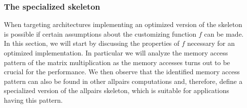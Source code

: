 \subsubsection{The specialized \allpairs skeleton}
\label{sec:opt_allpairs_skeleton}
When targeting \GPU architectures implementing an optimized version of the \allpairs skeleton is possible if certain assumptions about the customizing function $f$ can be made.
In this section, we will start by discussing the properties of $f$ necessary for an optimized \GPU implementation.
In particular we will analyze the memory access pattern of the matrix multiplication as the memory accesses turns out to be crucial for the performance.
We then observe that the identified memory access pattern can also be found in other allpairs computations and, therefore, define a specialized version of the allpairs skeleton, which is suitable for applications having this pattern.


